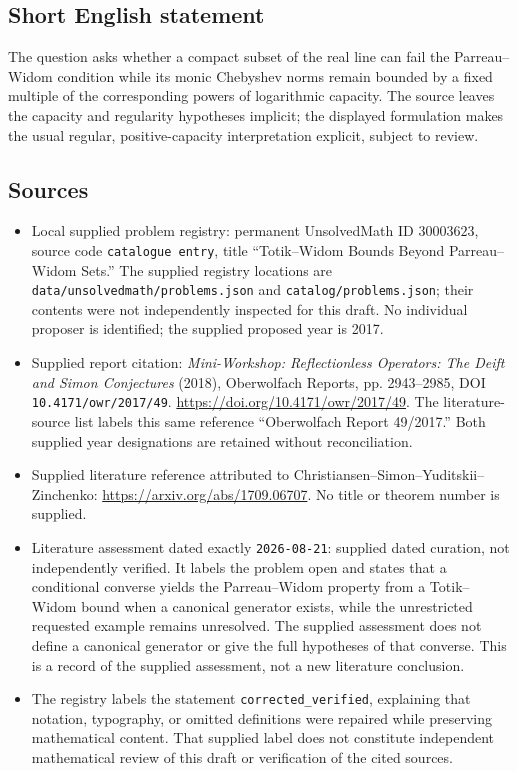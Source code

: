 \documentclass[11pt]{article}
\begin{document}
\subsection{Short English statement}
The question asks whether a compact subset of the real line can fail the Parreau--Widom condition while its monic Chebyshev norms remain bounded by a fixed multiple of the corresponding powers of logarithmic capacity. The source leaves the capacity and regularity hypotheses implicit; the displayed formulation makes the usual regular, positive-capacity interpretation explicit, subject to review.
\subsection{Sources}
\begin{itemize}
\item Local supplied problem registry: permanent UnsolvedMath ID \(30003623\), source code \texttt{catalogue entry}, title ``Totik--Widom Bounds Beyond Parreau--Widom Sets.'' The supplied registry locations are \texttt{data/unsolvedmath/problems.json} and \texttt{catalog/problems.json}; their contents were not independently inspected for this draft. No individual proposer is identified; the supplied proposed year is 2017.
\item Supplied report citation: \emph{Mini-Workshop: Reflectionless Operators: The Deift and Simon Conjectures} (2018), Oberwolfach Reports, pp. 2943--2985, DOI \texttt{10.4171/owr/2017/49}. \url{https://doi.org/10.4171/owr/2017/49}. The literature-source list labels this same reference ``Oberwolfach Report 49/2017.'' Both supplied year designations are retained without reconciliation.
\item Supplied literature reference attributed to Christiansen--Simon--Yuditskii--Zinchenko: \url{https://arxiv.org/abs/1709.06707}. No title or theorem number is supplied.
\item Literature assessment dated exactly \texttt{2026-08-21}: supplied dated curation, not independently verified. It labels the problem open and states that a conditional converse yields the Parreau--Widom property from a Totik--Widom bound when a canonical generator exists, while the unrestricted requested example remains unresolved. The supplied assessment does not define a canonical generator or give the full hypotheses of that converse. This is a record of the supplied assessment, not a new literature conclusion.
\item The registry labels the statement \texttt{corrected\_verified}, explaining that notation, typography, or omitted definitions were repaired while preserving mathematical content. That supplied label does not constitute independent mathematical review of this draft or verification of the cited sources.
\end{itemize}
\end{document}
